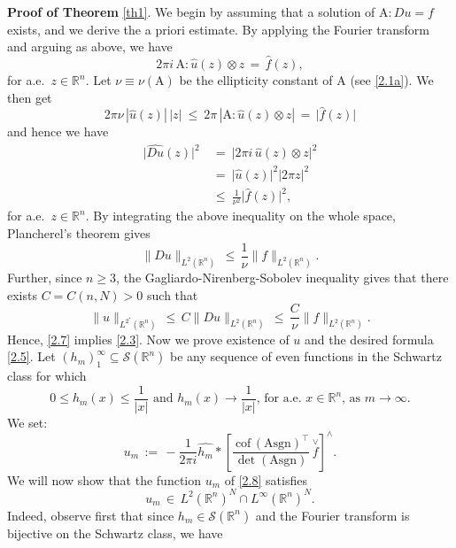 \documentclass{amsart}
\theoremstyle{definition}
\numberwithin{equation}{section}
\begin{document}
{\medskip \noindent \textbf{Proof of Theorem} } \ref{th1}. We begin by assuming that a solution of ${\textrm{A}} :Du =f$ exists, and we derive the a priori estimate. By applying the Fourier transform and arguing as above, we have
\[
2\pi i\, {\textrm{A}} : \widehat{u}(z) {\otimes} z \, =\,  \widehat{f}(z),
\]
for a.e.\ $z\in {\mathbb{R}}^n$. Let $\nu\equiv \nu({\textrm{A}})$ be the ellipticity constant of ${\textrm{A}}$ (see \eqref{2.1a}). We then get
\[
2\pi \nu\, |\widehat{u}(z)| \, |z| \ \leq \ 2\pi \, |{\textrm{A}} : \widehat{u}(z) {\otimes} z| \, =\,  \big|\widehat{f}(z) \big|
\]
and hence we have
\begin{align}
\big| \widehat{Du}(z)\big|^2 \ &=\ \big|2\pi i \, \widehat{u}(z) {\otimes} z \big|^2 \nonumber \\
& =\  \big| \widehat{u}(z)\big|^2|2\pi z|^2  \nonumber\\
& \leq \ \frac{1}{\nu^2} \big|\widehat{f}(z) \big|^2, \nonumber
\end{align}
for a.e.\ $z\in {\mathbb{R}}^n$. By integrating the above inequality on the whole space, Plancherel's theorem gives 
\[
\| Du\|_{L^2({\mathbb{R}}^n)} \, \leq \, \frac{1}{\nu} \| f\|_{L^2({\mathbb{R}}^n)}.
\]
Further, since $n\geq 3$, the Gagliardo-Nirenberg-Sobolev inequality gives that there exists $C=C(n,N)>0$ such that
\begin{equation} \label{2.7}
\| u\|_{L^{2^*}({\mathbb{R}}^n)} \, \leq \, C\| Du\|_{L^2({\mathbb{R}}^n)} \, \leq\, \frac{C}{\nu} \| f\|_{L^2({\mathbb{R}}^n)}.
\end{equation}
Hence, \eqref{2.7} implies \eqref{2.3}. Now we prove existence of $u$ and the desired formula \eqref{2.5}. Let $(h_m)^\infty_1 {\subseteq} {\mathcal{S}}({\mathbb{R}}^n)$ be any sequence of even functions in the Schwartz class for which 
\begin{equation} \label{2.7a}
\text{$0\leq h_m(x) \leq \frac{1}{|x|}$ \  and \ $h_m(x) {\longrightarrow} \frac{1}{|x|}$, \ for a.e.\ $x\in {\mathbb{R}}^n$,\  as $m{\rightarrow} \infty$.} 
\end{equation}
We set:
\begin{equation} \label{2.8}
u_m\, :=\, -\frac{1}{2\pi i} 
 \widehat{h_m} \ast
\left[ 
\frac{ \ {\textrm{cof}} \,({\textrm{A}} {\textrm{sgn}} )^\top }{ \det ({\textrm{A}} {\textrm{sgn}}) }\, \overset{\vee}{f}
\right]^{\wedge} .
\end{equation}
We will now show that the function $ u_m$ of \eqref{2.8} satisfies
\[
u_m\, \in\, L^2({\mathbb{R}}^n)^N\cap L^\infty({\mathbb{R}}^n)^N. 
\]
Indeed, observe first that since ${h_m} \in {\mathcal{S}}({\mathbb{R}}^n)$ and the Fourier transform is bijective on the Schwartz class, we have
\end{document}
